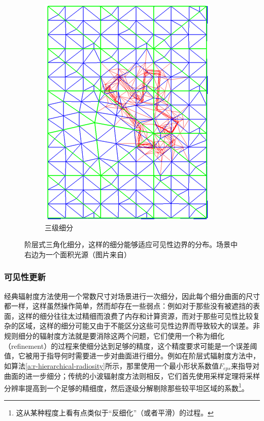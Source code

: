 \begin{figure}
\begin{fullwidth}
\begin{subfigure}[b]{0.245\thewidth}
		\includegraphics[width=1.\textwidth]{figures/r/hierarchical-triangulation-4}
		\caption{三级细分}
	\end{subfigure}
	\caption{阶层式三角化细分，这样的细分能够适应可见性边界的分布。场景中右边为一个面积光源（图片来自\cite{a:FastandAccurateHierarchicalRadiosityUsingGlobalVisibility}）}
	\label{f:r-hierarchical-triangulation}
\end{fullwidth}
\end{figure}




\subsubsection{可见性更新}
经典辐射度方法使用一个常数尺寸对场景进行一次细分，因此每个细分曲面的尺寸都一样，这样虽然操作简单，然而却存在一些弱点：例如对于那些没有被遮挡的表面，这样的细分往往太过精细而浪费了内存和计算资源，而对于那些可见性比较复杂的区域，这样的细分可能又由于不能区分这些可见性边界而导致较大的误差。非规则细分的辐射度方法就是要消除这两个问题，它们使用一个称为细化（refinement）的过程来使细分达到足够的精度，这个精度要求可能是一个误差阈值，它被用于指导何时需要进一步对曲面进行细分。例如在阶层式辐射度方法中，如算法\ref{a:r-hierarchical-radiosity}所示，那里使用一个最小形状系数值$F_{eps}$来指导对曲面的进一步细分；传统的小波辐射度方法则相反，它们首先使用采样定理将采样分辨率提高到一个足够的精细度，然后逐级分解剔除那些较平坦区域的系数\footnote{这从某种程度上看有点类似于“反细化”（或者平滑）的过程。}。

